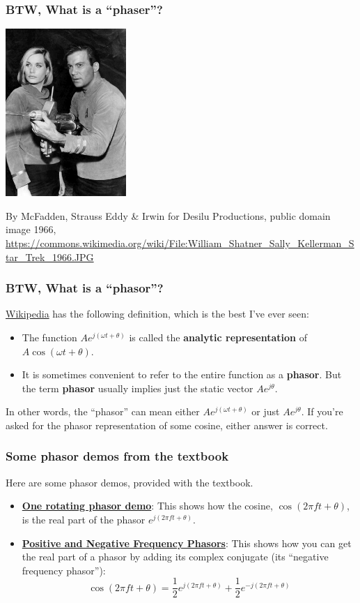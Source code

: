 \documentclass{beamer}
\begin{document}
\begin{frame}
  \frametitle{BTW, What is a ``phaser''?}
  \centerline{\includegraphics[height=2.5in]{startrek.jpg}}
  \begin{tiny}
    By McFadden, Strauss Eddy \& Irwin for Desilu Productions, public domain image 1966,
    \url{https://commons.wikimedia.org/wiki/File:William_Shatner_Sally_Kellerman_Star_Trek_1966.JPG}
  \end{tiny}
\end{frame}

\begin{frame}
  \frametitle{BTW, What is a  ``phasor''?}

  \href{https://en.wikipedia.org/wiki/Phasor}{Wikipedia} has the following definition, which is
  the best I've ever seen:
  \begin{itemize}
    \item The function $Ae^{j(\omega t+\theta)}$ is called the {\bf
      analytic representation} of $A\cos(\omega t+\theta)$.
    \item It is sometimes convenient to refer to the entire function
      as a {\bf phasor}. But the term {\bf phasor} usually implies just the static
      vector $Ae^{j\theta}$.
  \end{itemize}
  In other words, the ``phasor'' can mean either $Ae^{j(\omega
    t+\theta)}$ or just $Ae^{j\theta}$.  If you're asked for the
  phasor representation of some cosine, either answer is correct.
\end{frame}

\begin{frame}
  \frametitle{Some phasor demos from the textbook}

  Here are some phasor demos, provided with the textbook.
  \begin{itemize}
  \item\href{http://dspfirst.gatech.edu/chapters/03spect/demos/phasors/index.html}{\bf\color{blue}One
    rotating phasor demo}: This shows how the cosine, $\cos(2\pi ft
    +\theta)$, is the real part of the phasor $e^{j(2\pi ft+\theta)}$.
  \item\href{http://dspfirst.gatech.edu/chapters/03spect/demos/phasors/index.html}{\bf\color{blue}Positive
    and Negative Frequency Phasors}: This shows how you can get the
    real part of a phasor by adding its complex conjugate (its ``negative frequency phasor''):
    \[
    \cos(2\pi ft+\theta)=\frac{1}{2}e^{j(2\pi ft+\theta)} + \frac{1}{2}e^{-j(2\pi ft+\theta)}
    \]
  \end{itemize}
\end{frame}
\end{document}
